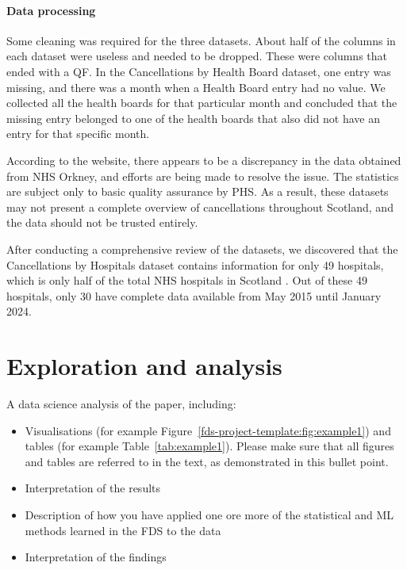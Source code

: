 \documentclass[11pt,a4paper]{article}
\begin{document}
\paragraph{Data processing} 
Some cleaning was required for the three datasets. About half of the columns in each dataset were useless and needed to be dropped. These were columns that ended with a QF. In the Cancellations by Health Board dataset, one entry was missing, and there was a month when a Health Board entry had no value. We collected all the health boards for that particular month and concluded that the missing entry belonged to one of the health boards that also did not have an entry for that specific month.

According to the website, there appears to be a discrepancy in the data obtained from NHS Orkney, and efforts are being made to resolve the issue. The statistics are subject only to basic quality assurance by PHS. As a result, these datasets may not present a complete overview of cancellations throughout Scotland, and the data should not be trusted entirely.

After conducting a comprehensive review of the datasets, we discovered that the Cancellations by Hospitals dataset contains information for only 49 hospitals, which is only half of the total NHS hospitals in Scotland \cite{hospital_scotland}. Out of these 49 hospitals, only 30 have complete data available from May 2015 until January 2024.


\section{Exploration and  analysis}



A data science analysis of the paper, including: 
\begin{itemize}
\item Visualisations (for example
  Figure~\ref{fds-project-template:fig:example1}) and tables (for
  example Table~\ref{tab:example1}). Please make sure that all figures
  and tables are referred to in the text, as demonstrated in this
  bullet point. 
\item Interpretation of the results 
\item Description of how you have applied one ore more of the
  statistical and ML methods learned in the FDS to the data
\item Interpretation of the findings 
\end{itemize}
\end{document}
